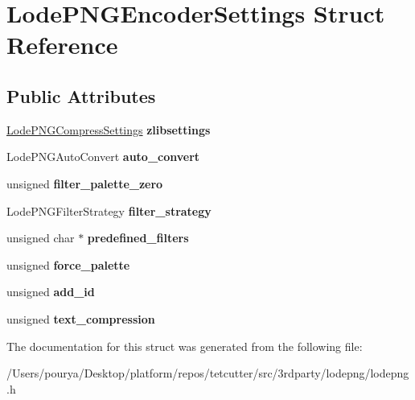 \hypertarget{structLodePNGEncoderSettings}{}\section{Lode\+P\+N\+G\+Encoder\+Settings Struct Reference}
\label{structLodePNGEncoderSettings}
\subsection*{Public Attributes}
\begin{DoxyCompactItemize}
\item 
\hypertarget{structLodePNGEncoderSettings_a2c5928b4172c75e27de467870f2ff946}{}\hyperlink{structLodePNGCompressSettings}{Lode\+P\+N\+G\+Compress\+Settings} {\bfseries zlibsettings}\label{structLodePNGEncoderSettings_a2c5928b4172c75e27de467870f2ff946}

\item 
\hypertarget{structLodePNGEncoderSettings_a4cad5feafb33c208706886bedb93d3d4}{}Lode\+P\+N\+G\+Auto\+Convert {\bfseries auto\+\_\+convert}\label{structLodePNGEncoderSettings_a4cad5feafb33c208706886bedb93d3d4}

\item 
\hypertarget{structLodePNGEncoderSettings_a0d82e8f2fabcb6cebbc54b80922945f1}{}unsigned {\bfseries filter\+\_\+palette\+\_\+zero}\label{structLodePNGEncoderSettings_a0d82e8f2fabcb6cebbc54b80922945f1}

\item 
\hypertarget{structLodePNGEncoderSettings_a5e18e4eb941763a2e3e6c65ee9f0729c}{}Lode\+P\+N\+G\+Filter\+Strategy {\bfseries filter\+\_\+strategy}\label{structLodePNGEncoderSettings_a5e18e4eb941763a2e3e6c65ee9f0729c}

\item 
\hypertarget{structLodePNGEncoderSettings_ad70b06025a5138e5ca02d0035ecccb28}{}unsigned char $\ast$ {\bfseries predefined\+\_\+filters}\label{structLodePNGEncoderSettings_ad70b06025a5138e5ca02d0035ecccb28}

\item 
\hypertarget{structLodePNGEncoderSettings_a04dc9622ccd1d7c74c56291409aa512a}{}unsigned {\bfseries force\+\_\+palette}\label{structLodePNGEncoderSettings_a04dc9622ccd1d7c74c56291409aa512a}

\item 
\hypertarget{structLodePNGEncoderSettings_a893aa542aa7c122c32ee36dd716fbcb2}{}unsigned {\bfseries add\+\_\+id}\label{structLodePNGEncoderSettings_a893aa542aa7c122c32ee36dd716fbcb2}

\item 
\hypertarget{structLodePNGEncoderSettings_a6ffdcb8e85a65ea208fe027be072d710}{}unsigned {\bfseries text\+\_\+compression}\label{structLodePNGEncoderSettings_a6ffdcb8e85a65ea208fe027be072d710}

\end{DoxyCompactItemize}


The documentation for this struct was generated from the following file\+:\begin{DoxyCompactItemize}
\item 
/\+Users/pourya/\+Desktop/platform/repos/tetcutter/src/3rdparty/lodepng/lodepng.\+h\end{DoxyCompactItemize}
